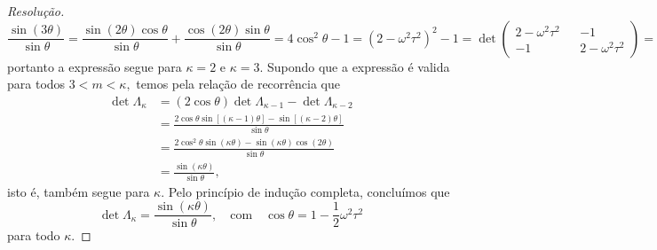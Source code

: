 \begin{proof}[Resolução]
\begin{equation*}
      \frac{\sin(3 \theta)}{\sin\theta} = \frac{\sin(2\theta) \cos\theta}{\sin\theta} + \frac{\cos(2\theta)\sin\theta}{\sin\theta} = 4\cos^2\theta - 1 = (2 - \omega^2 \tau^2)^2 - 1 = \det\left(\begin{smallmatrix}
         2 - \omega^2 \tau^2 && -1\\
         -1 && 2 - \omega^2\tau^2
   \end{smallmatrix}\right) = \det{\Lambda_{3}},
   \end{equation*}
   portanto a expressão segue para \(\kappa = 2\) e \(\kappa = 3\). Supondo que a expressão é valida para todos \(3 < m < \kappa,\) temos pela relação de recorrência que
   \begin{align*}
      \det{\Lambda_{\kappa}} &= (2\cos\theta) \det{\Lambda_{\kappa - 1}} - \det{\Lambda}_{\kappa -2}\\
                            &= \frac{2 \cos\theta \sin[(\kappa - 1)\theta] - \sin[(\kappa - 2)\theta]}{\sin\theta}\\
                            &= \frac{2 \cos^2\theta \sin(\kappa \theta) - \sin(\kappa \theta) \cos(2\theta)}{\sin\theta}\\
                            &= \frac{\sin(\kappa \theta)}{\sin\theta},
   \end{align*}
   isto é, também segue para \(\kappa\). Pelo princípio de indução completa, concluímos que
   \begin{equation*}
      \det{\Lambda_{\kappa}} = \frac{\sin(\kappa \theta)}{\sin\theta},\quad\text{com}\quad\cos\theta = 1 - \frac12 \omega^2 \tau^2
   \end{equation*}
   para todo \(\kappa\).


\end{proof}
